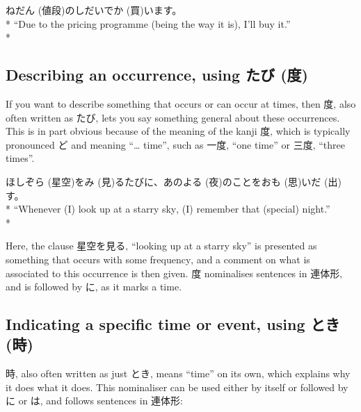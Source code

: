 \documentclass[11pt, b5paper, twoside, openright, onecolumn]{book}
\makeatletter
\newcommand*{\rubystack}[2]{{\relscale{0.5}%
  \begin{tabular}[b]{@{}c@{}}%
    {#1}\\%
   {\textscale{2}{#2}}%
  \end{tabular}}%
}
\DeclareRobustCommand*{\ruby}[2]{%
  \mbox{%
    \setlength{\parskip}{0ex}%
    \BeginAccSupp{method=pdfstringdef,ActualText={#1}}%
      \rubystack{\phantom{#2}}{#1}%
      \llap{%
        \rubystack{#2}{\phantom{#1}}%
      }%
    \EndAccSupp{}%
  }%
}
\renewcommand*{\ruby}[2]{#2 (#1)}%
\newenvironment{exampleblock}{
\setlength{\parindent}{0.6in}
\begin{minipage}[t]{\dimexpr\textwidth-\parindent}}
{\end{minipage}}
\makeatother
\begin{document}
\vspace{0.4cm}
\begin{exampleblock}
\ruby{値段}{ねだん}のしだいで\ruby{買}{か}います。 \\* 
“Due to the pricing programme (being the way it is)‚ I’ll buy it.” \\* 
\end{exampleblock}
\subsection{Describing an occurrence‚ using \ruby{度}{たび}}


If you want to describe something that occurs or can occur at times‚ then 度‚ also often written as たび‚ lets you say something general about these occurrences. This is in part obvious because of the meaning of the kanji 度‚ which is typically pronounced ど and meaning “… time”‚ such as 一度‚ “one time” or 三度‚ “three times”.

\vspace{0.4cm}
\begin{exampleblock}
\ruby{星空}{ほしぞら}を\ruby{見}{み}るたびに、あの\ruby{夜}{よる}のことを\ruby{思}{おも}い\ruby{出}{だ}す。 \\* 
“Whenever (I) look up at a starry sky‚ (I) remember that (special) night.” \\* 
\end{exampleblock}
\vspace{0.2cm}

Here‚ the clause 星空を見る‚ “looking up at a starry sky” is presented as something that occurs with some frequency‚ and a comment on what is associated to this occurrence is then given. 度 nominalises sentences in 連体形‚ and is followed by に‚ as it marks a time.

\subsection{Indicating a specific time or event‚ using \ruby{時}{とき}}

時‚ also often written as just とき‚ means “time” on its own‚ which explains why it does what it does. This nominaliser can be used either by itself or followed by に or は‚ and follows sentences in 連体形:
\end{document}
